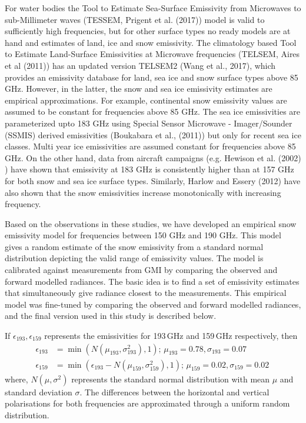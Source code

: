 \documentclass[amt, manuscript]{copernicus}
\begin{document}
For water bodies the Tool to Estimate Sea-Surface Emissivity from Microwaves to sub-Millimeter waves (TESSEM, Prigent et al. (2017)) model is valid to sufficiently high frequencies, but for other surface types no ready models are at hand and estimates of land, ice and snow emissivity. The climatology based Tool to Estimate Land-Surface Emissivities at Microwave frequencies (TELSEM, Aires et al (2011)) has an updated version TELSEM2 (Wang et al., 2017), which provides an emissivity database for land, sea ice and snow surface types above 85 GHz. However, in the latter,  the snow and sea ice emissivity estimates are empirical approximations. For example, continental snow emissivity values are assumed to be constant for frequencies above 85 GHz. The sea ice emissivities are parameterized upto 183 GHz using Special Sensor Microwave - Imager/Sounder (SSMIS) derived emissivities (Boukabara et al., (2011)) but only for recent sea ice classes. Multi year ice emissivities are assumed constant for frequencies above 85 GHz. On the other hand, data from aircraft campaigns (e.g. Hewison et al. (2002) ) have shown that emissivity at 183 GHz is consistently higher than at 157 GHz for both snow and sea ice surface types. Similarly, Harlow and Essery (2012) have also shown that the snow emissivities increase monotonically with increasing frequency. 

Based on the observations in these studies, we have developed an empirical snow emissivity model for frequencies between 150 GHz and 190 GHz. This model gives a random estimate of the snow emissivity from a standard normal distribution depicting the valid range of emissivity values. The model is calibrated against measurements from GMI by comparing the observed and forward modelled radiances. The basic idea is to find a set of emissivity estimates that simultaneously give radiance closest to the measurements.
This empirical model was fine-tuned by comparing the observed and forward modelled radiances, and the final version used in this study is described below. 

If $\epsilon_{193}, \epsilon_{159}$ represents the emissivities for 193\,GHz and
159\,GHz respectively, then
\begin{align}
\epsilon_{193}& = \min({N(\mu_{193}, \sigma_{193}^{2}), 1});\, \mu_{193} = 0.78, \sigma_{193} = 0.07 \label{eq:1}\\
\epsilon_{159}& = \min(\epsilon_{193} - N(\mu_{159}, \sigma_{159}^{2}), 1) ;\,  \mu_{159} = 0.02, \sigma_{159} = 0.02\,\label{eq:2}
\end{align}
where, $N(\mu, \sigma^{2})$ represents the standard normal distribution with
mean $\mu$ and standard deviation $\sigma$. The differences between the
horizontal and vertical polarisations for both frequencies are 
approximated through a uniform random distribution.
\end{document}
